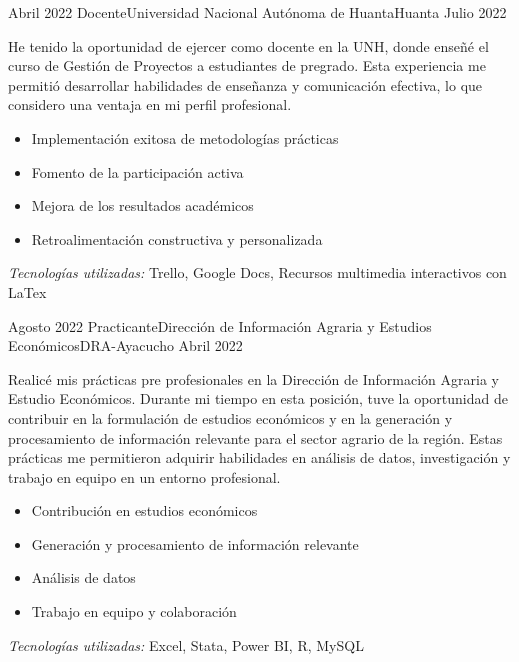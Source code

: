 
\begin{experiences}

  \experience
  {Abril 2022}    {Docente}{Universidad Nacional Autónoma de Huanta}{Huanta}
  {Julio 2022}   {
    He tenido la oportunidad de ejercer como docente en la UNH, donde enseñé el curso de Gestión de Proyectos a estudiantes de pregrado. Esta experiencia me permitió desarrollar habilidades de enseñanza y comunicación efectiva, lo que considero una ventaja en mi perfil profesional.
    \begin{itemize}
      \item Implementación exitosa de metodologías prácticas
      \item Fomento de la participación activa
      \item Mejora de los resultados académicos
      \item Retroalimentación constructiva y personalizada
    \end{itemize}
  }
  {\footnotesize{\emph{Tecnologías utilizadas:} Trello, Google Docs, Recursos multimedia interactivos con LaTex}}
  \emptySeparator

  \experience
  {Agosto 2022}    {Practicante}{Dirección de Información Agraria y Estudios Económicos}{DRA-Ayacucho}
  {Abril 2022}   {
    Realicé mis prácticas pre profesionales en la Dirección de Información Agraria y Estudio Económicos. Durante mi tiempo en esta posición, tuve la oportunidad de contribuir en la formulación de estudios económicos y en la generación y procesamiento de información relevante para el sector agrario de la región. Estas prácticas me permitieron adquirir habilidades en análisis de datos, investigación y trabajo en equipo en un entorno profesional.
    \begin{itemize}
      \item Contribución en estudios económicos
      \item Generación y procesamiento de información relevante
      \item Análisis de datos
      \item Trabajo en equipo y colaboración
    \end{itemize}
  }
  {\footnotesize{\emph{Tecnologías utilizadas:} Excel, Stata, Power BI, R, MySQL}}
  \emptySeparator


\end{experiences}
